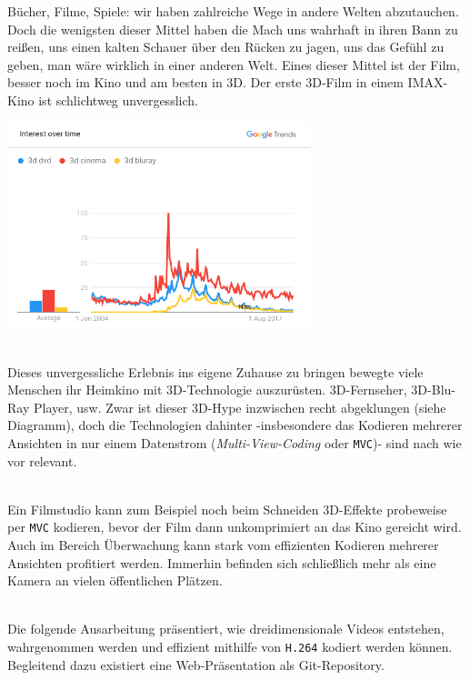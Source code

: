 B\"ucher, Filme, Spiele: wir haben zahlreiche Wege in andere Welten abzutauchen.
Doch die wenigsten dieser Mittel haben die Mach uns wahrhaft in ihren Bann zu rei{\ss}en, uns einen kalten Schauer \"uber
den R\"ucken zu jagen, uns das Gef\"uhl zu geben, man w\"are wirklich in einer anderen Welt.
Eines dieser Mittel ist der Film, besser noch im Kino und am besten in 3D.
Der erste 3D-Film in einem IMAX-Kino ist schlichtweg unvergesslich.

\begin{center}
    \includegraphics[width=0.66\textwidth]{../img/trends-3d.png}
\end{center}
\noindent\\ Dieses unvergessliche Erlebnis ins eigene Zuhause zu bringen bewegte viele Menschen ihr Heimkino mit 3D-Technologie
auszur\"usten.
3D-Fernseher, 3D-Blu-Ray Player, usw.
Zwar ist dieser 3D-Hype inzwischen recht abgeklungen (siehe Diagramm), doch die Technologien dahinter -insbesondere
das Kodieren mehrerer Ansichten in nur einem Datenstrom (\textit{Multi-View-Coding} oder \texttt{MVC})- sind nach wie
vor
relevant.

\noindent\\ Ein Filmstudio kann zum Beispiel noch beim Schneiden 3D-Effekte probeweise per \texttt{MVC} kodieren,
bevor der Film dann unkomprimiert an das Kino gereicht wird.
Auch im Bereich \"Uberwachung kann stark vom effizienten Kodieren mehrerer Ansichten profitiert werden.
Immerhin befinden sich schlie{\ss}lich mehr als eine Kamera an vielen \"offentlichen Pl\"atzen.

\noindent\\ Die folgende Ausarbeitung pr\"asentiert, wie dreidimensionale Videos entstehen, wahrgenommen werden und
effizient mithilfe von \texttt{H.264} kodiert werden k\"onnen.
Begleitend dazu existiert eine Web-Präsentation als Git-Repository\cite{github}.
